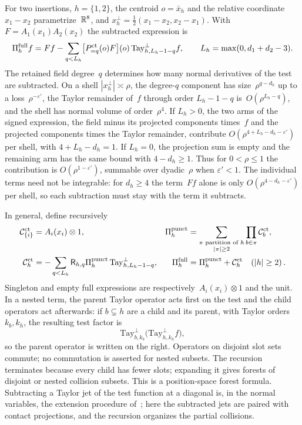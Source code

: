 For two insertions, $h=\{1,2\}$, the centroid $o=\bar x_h$ and the relative coordinate $x_1-x_2$ parametrize~$\mathbb{R}^8$, and $x_h^\perp=\tfrac12(x_1-x_2,x_2-x_1)$. With $F=A_1(x_1)A_2(x_2)$ the subtracted expression is
\begin{equation*}
\Pi_h^{\rm full}f
=Ff-\sum_{q<L_h}
\bigl[P_{=q}^{\rm ct}(o)F\bigr](o)\,
\mathrm{Tay}_{h,L_h-1-q}^{\perp}f,\qquad L_h=\max(0,d_1+d_2-3).
\end{equation*}
The retained field degree~$q$ determines how many normal derivatives of the test are subtracted. On a shell $|x_h^\perp|\asymp\rho$, the degree-$q$ component has size~$\rho^{q-d_h}$ up to a loss~$\rho^{-\varepsilon'}$, the Taylor remainder of~$f$ through order $L_h-1-q$ is~$O(\rho^{L_h-q})$, and the shell has normal volume of order~$\rho^{4}$. If $L_h>0$, the two arms of the signed expression, the field minus its projected components times~$f$ and the projected components times the Taylor remainder, contribute $O(\rho^{4+L_h-d_h-\varepsilon'})$ per shell, with $4+L_h-d_h=1$. If $L_h=0$, the projection sum is empty and the remaining arm has the same bound with $4-d_h\ge1$. Thus for $0<\rho\le1$ the contribution is $O(\rho^{1-\varepsilon'})$, summable over dyadic~$\rho$ when $\varepsilon'<1$. The individual terms need not be integrable: for $d_h\ge4$ the term~$Ff$ alone is only $O(\rho^{4-d_h-\varepsilon'})$ per shell, so each subtraction must stay with the term it subtracts.

In general, define recursively
\begin{align}\label{eq:J-contact-recursion}
\mathcal C_{\{i\}}^{\rm ct}&=A_i(x_i)\otimes1,&
\Pi_h^{\rm punct}&=\sum_{\substack{\pi\text{ partition of }h\\|\pi|\ge2}}
                         \prod_{b\in\pi}\mathcal C_b^{\rm ct},\\
\mathcal C_h^{\rm ct}&=-\sum_{q<L_h}\mathsf R_{h,q}\Pi_h^{\rm punct}\,
                         \mathrm{Tay}_{h,L_h-1-q}^{\perp},&
\Pi_h^{\rm full}&=\Pi_h^{\rm punct}+\mathcal C_h^{\rm ct}\quad(|h|\ge2)\,.\notag
\end{align}
Singleton and empty full expressions are respectively~$A_i(x_i)\otimes1$ and the unit. In a nested term, the parent Taylor operator acts first on the test and the child operators act afterwards: if $b\subsetneq h$ are a child and its parent, with Taylor orders $k_b,k_h$, the resulting test factor is
\begin{equation*}
\mathrm{Tay}_{b,k_b}^{\perp}\bigl(\mathrm{Tay}_{h,k_h}^{\perp}f\bigr),
\end{equation*}
so the parent operator is written on the right. Operators on disjoint slot sets commute; no commutation is asserted for nested subsets. The recursion terminates because every child has fewer slots; expanding it gives forests of disjoint or nested collision subsets. This is a position-space forest formula. Subtracting a Taylor jet of the test function at a diagonal is, in the normal variables, the extension procedure of~\cite[Section~5.2, Theorem~5.3]{BrunettiFredenhagen2000}; here the subtracted jets are paired with contact projections, and the recursion organizes the partial collisions.

